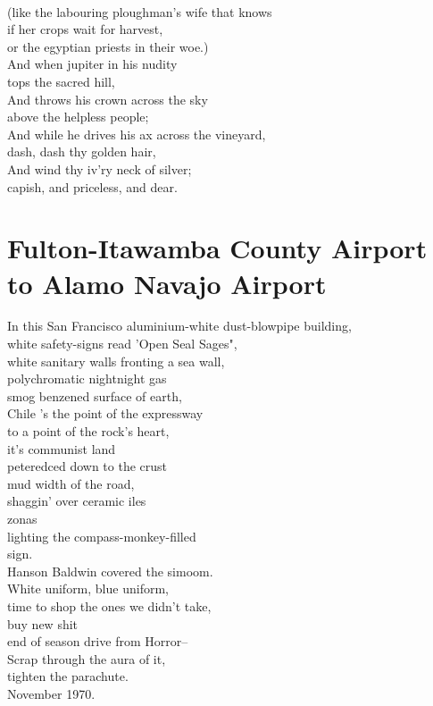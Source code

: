 \documentclass[smalldemyvopaper,11pt,twoside,onecolumn,openright,extrafontsizes]{memoir}
\begin{document}
\\(like the labouring ploughman's wife that knows
\\if her crops wait for harvest,
\\or the egyptian priests in their woe.)
\\And when jupiter in his nudity
\\tops the sacred hill,
\\And throws his crown across the sky
\\above the helpless people;
\\And while he drives his ax across the vineyard,
\\dash, dash thy golden hair,
\\And wind thy iv'ry neck of silver;
\\capish, and priceless, and dear.



\chapter{Fulton-Itawamba County Airport to Alamo Navajo Airport}
In this San Francisco aluminium-white dust-blowpipe building,
\\white safety-signs read 'Open Seal Sages",
\\white sanitary walls fronting a sea wall,
\\polychromatic nightnight gas
\\smog benzened surface of earth,
\\Chile 's the point of the expressway
\\to a point of the rock's heart,
\\it's communist land
\\peteredced down to the crust
\\mud width of the road,
\\shaggin' over ceramic iles
\\zonas
\\lighting the compass-monkey-filled
\\sign.
\\Hanson Baldwin covered the simoom.
\\White uniform, blue uniform,
\\time to shop the ones we didn't take,
\\buy new shit
\\end of season drive from Horror--
\\Scrap through the aura of it,
\\tighten the parachute.
\\November 1970.
\end{document}
